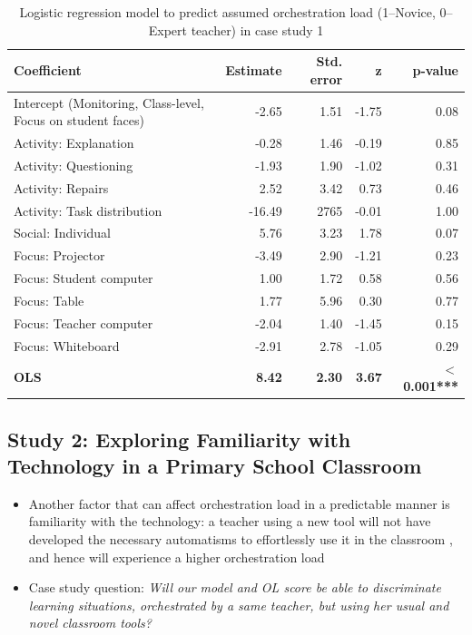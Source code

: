 \documentclass[10pt,journal,compsoc]{IEEEtran}
\begin{document}
\begin{table}[!t]
\caption{Logistic regression model to predict assumed orchestration load (1--Novice, 0--Expert teacher) in case study 1}
\label{tab:case1results}
\centering
\begin{tabular}{|p{2.8cm}||r|r|r|r|}
\hline
Coefficient & Estimate & Std. error & z & p-value\\
\hline
\hline
Intercept (Monitoring, Class-level, Focus on student faces) & -2.65 & 1.51 & -1.75 & 0.08 \\
Activity: Explanation & -0.28 & 1.46 & -0.19 & 0.85 \\
Activity: Questioning & -1.93 & 1.90 & -1.02 & 0.31 \\
Activity: Repairs & 2.52 & 3.42 & 0.73 & 0.46 \\
Activity: Task distribution & -16.49 & 2765 & -0.01 & 1.00 \\
Social: Individual & 5.76 & 3.23 & 1.78 & 0.07 \\
Focus: Projector & -3.49 & 2.90 & -1.21 & 0.23 \\
Focus: Student computer & 1.00 & 1.72 & 0.58 & 0.56 \\
Focus: Table & 1.77 & 5.96 & 0.30 & 0.77 \\
Focus: Teacher computer & -2.04 & 1.40 & -1.45 & 0.15 \\
Focus: Whiteboard & -2.91 & 2.78 & -1.05 & 0.29 \\
\textbf{OLS} & \textbf{8.42} & \textbf{2.30} & \textbf{3.67} & \textbf{$<$0.001***} \\
\hline
\end{tabular}
\end{table}


\subsection{Study 2: Exploring Familiarity with Technology in a Primary School Classroom}
\label{sec:study2}
\begin{itemize}
\item Another factor that can affect orchestration load in a predictable manner is familiarity with the technology: a teacher using a new tool will not have developed the necessary automatisms to effortlessly use it in the classroom \cite{feldon2007cognitive}, and hence will experience a higher orchestration load
\item Case study question: \textit{Will our model and OL score be able to discriminate learning situations, orchestrated by a same teacher, but using her usual and novel classroom tools?}
\end{itemize}
\end{document}
